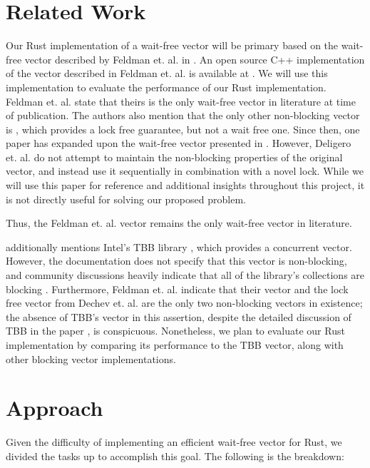 \documentclass[conference]{IEEEtran}
\begin{document}
\section{Related Work}

Our Rust implementation of a wait-free vector will be primary based on the wait-free vector described by Feldman et. al. in \cite{main}. An open source C++ implementation of the vector described in Feldman et. al. \cite{main} is available at \cite{cpp}. We will use this implementation to evaluate the performance of our Rust implementation.
Feldman et. al. \cite{main} state that theirs is the only wait-free vector in literature at time of publication. The authors \cite{main} also mention that the only other non-blocking vector is \cite{lfvec}, which provides a lock free guarantee, but not a wait free one. Since then, one paper \cite{mrlock} has expanded upon the wait-free vector presented in \cite{main}. However, Deligero et. al. \cite{mrlock} do not attempt to maintain the non-blocking properties of the original vector, and instead use it sequentially in combination with a novel lock. While we will use this paper for reference and additional insights throughout this project, it is not directly useful for solving our proposed problem. 

Thus, the Feldman et. al. \cite{main} vector remains the only wait-free vector in literature.

\cite{main} additionally mentions Intel’s TBB library \cite{tbb}, which provides a concurrent vector. However, the documentation does not specify that this vector is non-blocking, and community discussions heavily indicate that all of the library’s collections are blocking \cite{tbbcomm}. Furthermore, Feldman et. al. \cite{main} indicate that their vector and the lock free vector from Dechev et. al. \cite{lfvec} are the only two non-blocking vectors in existence; the absence of TBB’s vector in this assertion, despite the detailed discussion of TBB in the paper \cite{main}, is conspicuous. Nonetheless, we plan to evaluate our Rust implementation by comparing its performance to the TBB vector, along with other blocking vector implementations. 

\section{Approach}

Given the difficulty of implementing an efficient wait-free vector for Rust, we divided the tasks up to accomplish this goal. The following is the breakdown:
\end{document}
